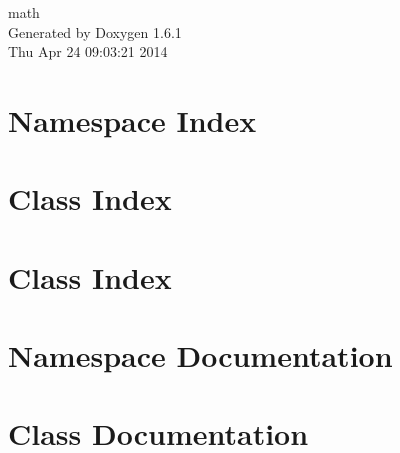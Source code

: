 \documentclass[a4paper]{book}
\begin{document}
\hypersetup{pageanchor=false}
\begin{titlepage}
\vspace*{7cm}
\begin{center}
{\Large math }\\
\vspace*{1cm}
{\large Generated by Doxygen 1.6.1}\\
\vspace*{0.5cm}
{\small Thu Apr 24 09:03:21 2014}\\
\end{center}
\end{titlepage}
\clearemptydoublepage
{}
\tableofcontents
\clearemptydoublepage
{}
\hypersetup{pageanchor=true}
\chapter{Namespace Index}

\chapter{Class Index}

\chapter{Class Index}

\chapter{Namespace Documentation}


\chapter{Class Documentation}






































\printindex
\end{document}
